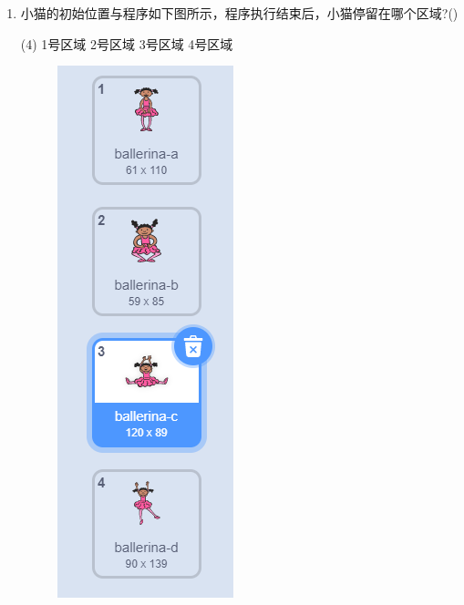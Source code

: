 \documentclass[10pt, a4paper]{article}
\begin{document}
\begin{enumerate}
        \item 小猫的初始位置与程序如下图所示，程序执行结束后，小猫停留在哪个区域?(\qquad)
        \begin{tasks}(4)
            \task 1号区域
            \task 2号区域
            \task 3号区域
            \task 4号区域
        \end{tasks}

        \begin{figure}[htbp]
            \centering
            \begin{minipage}[t]{.08\textwidth}
                \centering
                \includegraphics[width=\textwidth]{21.png}

\end{minipage}
\end{figure}
\end{enumerate}
\end{document}
